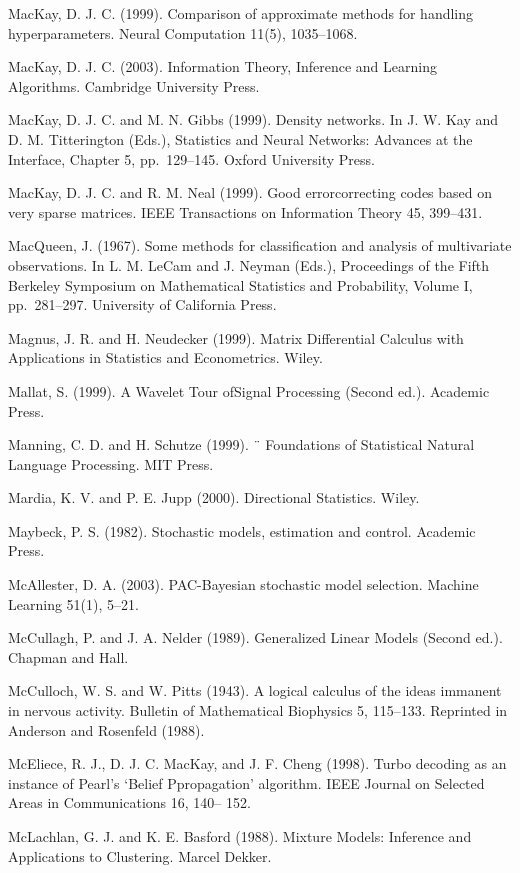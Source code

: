 \documentclass[
  10
]{article}
\begin{document}
MacKay, D. J. C. (1999). Comparison of approximate methods for handling
hyperparameters. Neural Computation 11(5), 1035--1068.

MacKay, D. J. C. (2003). Information Theory, Inference and Learning
Algorithms. Cambridge University Press.

MacKay, D. J. C. and M. N. Gibbs (1999). Density networks. In J. W. Kay
and D. M. Titterington (Eds.), Statistics and Neural Networks: Advances
at the Interface, Chapter 5, pp.~129--145. Oxford University Press.

MacKay, D. J. C. and R. M. Neal (1999). Good errorcorrecting codes based
on very sparse matrices. IEEE Transactions on Information Theory 45,
399--431.

MacQueen, J. (1967). Some methods for classification and analysis of
multivariate observations. In L. M. LeCam and J. Neyman (Eds.),
Proceedings of the Fifth Berkeley Symposium on Mathematical Statistics
and Probability, Volume I, pp.~281--297. University of California Press.

Magnus, J. R. and H. Neudecker (1999). Matrix Differential Calculus with
Applications in Statistics and Econometrics. Wiley.

Mallat, S. (1999). A Wavelet Tour ofSignal Processing (Second ed.).
Academic Press.

Manning, C. D. and H. Schutze (1999). ¨ Foundations of Statistical
Natural Language Processing. MIT Press.

Mardia, K. V. and P. E. Jupp (2000). Directional Statistics. Wiley.

Maybeck, P. S. (1982). Stochastic models, estimation and control.
Academic Press.

McAllester, D. A. (2003). PAC-Bayesian stochastic model selection.
Machine Learning 51(1), 5--21.

McCullagh, P. and J. A. Nelder (1989). Generalized Linear Models (Second
ed.). Chapman and Hall.

McCulloch, W. S. and W. Pitts (1943). A logical calculus of the ideas
immanent in nervous activity. Bulletin of Mathematical Biophysics 5,
115--133. Reprinted in Anderson and Rosenfeld (1988).

McEliece, R. J., D. J. C. MacKay, and J. F. Cheng (1998). Turbo decoding
as an instance of Pearl's `Belief Ppropagation' algorithm. IEEE Journal
on Selected Areas in Communications 16, 140-- 152.

McLachlan, G. J. and K. E. Basford (1988). Mixture Models: Inference and
Applications to Clustering. Marcel Dekker.
\end{document}
